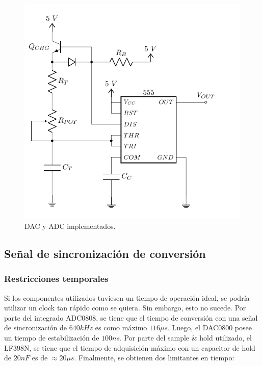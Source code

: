 \begin{figure}[H]
\centering
\includegraphics[width=\linewidth, page = 2]{ImagenesEjercicio1/Components.pdf}
\caption{DAC y ADC implementados.}
\label{fig:dacydac}
\end{figure}

\subsection{Señal de sincronización de conversión}

\subsubsection{Restricciones temporales}

Si los componentes utilizados tuviesen un tiempo de operación ideal, se podría utilizar un clock tan rápido como se quiera. Sin embargo, esto no sucede. Por parte del integrado ADC0808, se tiene que el tiempo de conversión con una señal de sincronización de $640kHz$ es como máximo $116\mu s$. Luego, el DAC0800 posee un tiempo de estabilización de $100ns$. Por parte del sample \& hold utilizado, el LF398N, se tiene que el tiempo de adquisición máximo con un capacitor de hold de $20 nF$ es de $\approx 20\mu s$. Finalmente, se obtienen dos limitantes en tiempo: 


